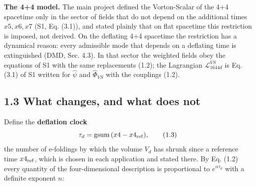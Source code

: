 \documentclass[
  10pt,
]{article}
\begin{document}
\textbf{The 4+4 model.} The main project defined the Vorton-Scalar of
the 4+4 spacetime only in the sector of fields that do not depend on the
additional times \(x5,x6,x7\) (S1, Eq. (3.1)), and stated plainly that
on flat spacetime this restriction is imposed, not derived. On the
deflating 4+4 spacetime the restriction has a dynamical reason: every
admissible mode that depends on a deflating time is extinguished (DMD,
Sec. 4.3). In that sector the weighted fields obey the equations of S1
with the same replacements (1.2); the Lagrangian
\(\mathcal L_{1644d}^{VS}\) is Eq. (3.1) of S1 written for \(\hat\psi\)
and \(\hat\Phi_{VS}\) with the couplings (1.2).

\hypertarget{what-changes-and-what-does-not}{%
\subsection{1.3 What changes, and what does
not}\label{what-changes-and-what-does-not}}

Define the \textbf{deflation clock}
\[\tau_d=\mathrm{gsum}\,(x4-x4_{\rm ref}),\tag{1.3}\] the number of
e-foldings by which the volume \(V_d\) has shrunk since a reference time
\(x4_{\rm ref}\), which is chosen in each application and stated there.
By Eq. (1.2) every quantity of the four-dimensional description is
proportional to \(e^{n\tau_d}\) with a definite exponent \(n\):
\end{document}
